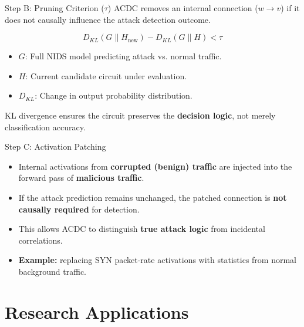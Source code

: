 \documentclass{beamer}
\begin{document}
	\begin{frame}{Step B: Pruning Criterion ($\tau$)}
		\justifying ACDC removes an internal connection ($w \rightarrow v$) if it does not
		causally influence the attack detection outcome.
		
		\vfill
		\begin{equation*}
			D_{KL}(G \parallel H_{\text{new}}) - D_{KL}(G \parallel H) < \tau
		\end{equation*}
		\vfill
		
		\begin{itemize}
			\item \textbf{$G$}: Full NIDS model predicting attack vs. normal traffic.
			\item \textbf{$H$}: Current candidate circuit under evaluation.
			\item \textbf{$D_{KL}$}: Change in output probability distribution.
		\end{itemize}
		
		\vspace{0.4cm}
		\justifying KL divergence ensures the circuit preserves the \textbf{decision logic},
		not merely classification accuracy.
	\end{frame}
	
	\begin{frame}{Step C: Activation Patching}
		\begin{itemize}
			\item \justifying Internal activations from \textbf{corrupted (benign) traffic}
			are injected into the forward pass of \textbf{malicious traffic}.
			
			\item \justifying If the attack prediction remains unchanged, the patched
			connection is \textbf{not causally required} for detection.
			
			\item \justifying This allows ACDC to distinguish
			\textbf{true attack logic} from incidental correlations.
			
			\item \justifying \textbf{Example:} replacing SYN packet-rate activations
			with statistics from normal background traffic.
		\end{itemize}
	\end{frame}
	
	\section{Research Applications}
	
\end{document}
